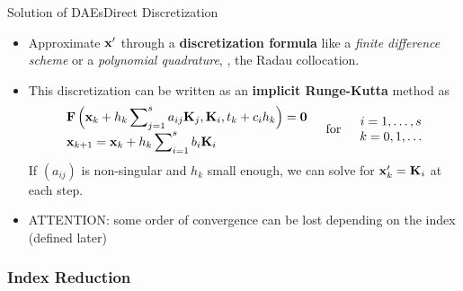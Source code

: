\begin{frame}{Solution of \aclp{DAE}}{Direct Discretization}
  \begin{itemize}
    \item Approximate $\mathbf{x}^\prime$ through a \textbf{discretization formula} like a \emph{finite difference scheme} or a \emph{polynomial quadrature}, \eg{}, the Radau collocation.
    \item This discretization can be written as an \textbf{implicit Runge-Kutta} method as
    \begin{equation*}
      \begin{array}{l}
        \mathbf{F}\left(\mathbf{x}_{k} + h_k\displaystyle\sum\nolimits_{j=1}^{s}a_{ij} \mathbf{K}_j, \mathbf{K}_i, t_{k} + c_i h_k\right) = \mathbf{0} \\[0.5em]
        \mathbf{x}_{k+1} = \mathbf{x}_{k} + h_k\displaystyle\sum\nolimits_{i=1}^{s} b_i \mathbf{K}_i
      \end{array}
      \quad \text{for} \quad
      \begin{array}{c}
        i = 1, \dots, s \\
        k = 0, 1, \dots
      \end{array}
    \end{equation*}
    If $(a_{ij})$ is non-singular and $h_k$ small enough, we can solve for $\mathbf{x}^\prime_k = \mathbf{K}_i$ at each step.
    \item ATTENTION: some order of convergence can be lost depending on the index (defined later)
  \end{itemize}
\end{frame}

\subsubsection{Index Reduction}

